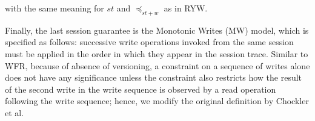 \documentclass[journal,compsoc]{IEEEtran}
\begin{document}
\begin{align}
\begin{split}
\end{split}
  \end{align} %
with the same meaning for $\mathit{st}$ and $\preccurlyeq_{\mathit{st}+w}$ as in RYW.
 \par Finally, the last session guarantee is the Monotonic Writes (MW) model, which is specified as follows: successive write operations invoked from the same session must be applied in the order in which they appear in the session trace. Similar to WFR, because of absence of versioning, a constraint on a sequence of writes alone does not have any significance unless the constraint also restricts how the result of the second write in the write sequence is observed by a read operation following the write sequence; hence, we modify the original definition by Chockler et al. %
\end{document}
